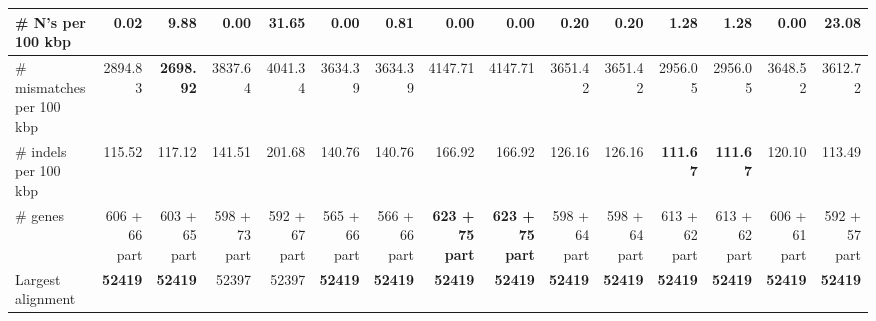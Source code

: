\documentclass[12pt,a4paper]{article}
\begin{document}
\begin{table}[ht]
\begin{center}
\begin{tabular}{|l*{14}{|r}|}
\# N's per 100 kbp & 0.02 & 9.88 & {\bf 0.00} & 31.65 & {\bf 0.00} & 0.81 & {\bf 0.00} & {\bf 0.00} & 0.20 & 0.20 & 1.28 & 1.28 & {\bf 0.00} & 23.08 \\ \hline
\# mismatches per 100 kbp & 2894.83 & {\bf 2698.92} & 3837.64 & 4041.34 & 3634.39 & 3634.39 & 4147.71 & 4147.71 & 3651.42 & 3651.42 & 2956.05 & 2956.05 & 3648.52 & 3612.72 \\ \hline
\# indels per 100 kbp & 115.52 & 117.12 & 141.51 & 201.68 & 140.76 & 140.76 & 166.92 & 166.92 & 126.16 & 126.16 & {\bf 111.67} & {\bf 111.67} & 120.10 & 113.49 \\ \hline
\# genes & 606 + 66 part & 603 + 65 part & 598 + 73 part & 592 + 67 part & 565 + 66 part & 566 + 66 part & {\bf 623 + 75 part} & {\bf 623 + 75 part} & 598 + 64 part & 598 + 64 part & 613 + 62 part & 613 + 62 part & 606 + 61 part & 592 + 57 part \\ \hline
Largest alignment & {\bf 52419} & {\bf 52419} & 52397 & 52397 & {\bf 52419} & {\bf 52419} & {\bf 52419} & {\bf 52419} & {\bf 52419} & {\bf 52419} & {\bf 52419} & {\bf 52419} & {\bf 52419} & {\bf 52419} \\ \hline
\end{tabular}
\end{center}
\end{table}
\end{document}
